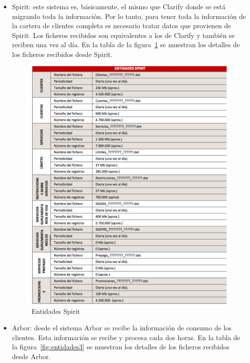 \documentclass[a4paper, 12pt]{book}
\begin{document}
\begin{itemize}
	\item Spirit: este sistema es, básicamente, el mismo que Clarify donde se está migrando toda la información. Por lo tanto, para tener toda la información de la cartera de clientes completa es necesario tratar datos que provienen de Spirit. Los ficheros recibidos son equivalentes a los de Clarify y también se reciben una vez al día. En la tabla de la figura~\ref{fig:entidades2} se muestran los detalles de los ficheros recibidos desde Spirit.

	\begin{figure}
	  \centering
	  \includegraphics[width=14cm, keepaspectratio]{img/entidades2}
	  \caption{Entidades Spirit}
	  \label{fig:entidades2}
	\end{figure}
	
	\item Arbor: desde el sistema Arbor se recibe la información de consumo de los clientes. Esta información se recibe y procesa cada dos horas. En la tabla de la figura~\ref{fig:entidades3} se muestran los detalles de los ficheros recibidos desde Arbor.


\end{itemize}
\end{document}
